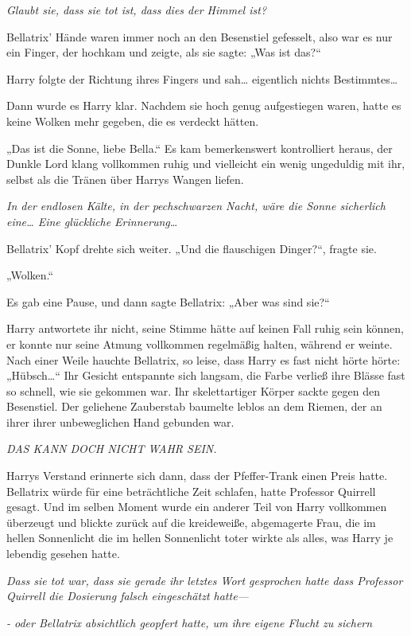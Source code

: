{\emph{Glaubt sie, dass sie tot ist, dass dies der Himmel ist?}

Bellatrix' Hände waren immer noch an den Besenstiel gefesselt, also war es nur ein Finger, der hochkam und zeigte, als sie sagte: „Was ist das?“

Harry folgte der Richtung ihres Fingers und sah… eigentlich nichts Bestimmtes…

Dann wurde es Harry klar. Nachdem sie hoch genug aufgestiegen waren, hatte es keine Wolken mehr gegeben, die es verdeckt hätten.

„Das ist die Sonne, liebe Bella.“ Es kam bemerkenswert kontrolliert heraus, der Dunkle Lord klang vollkommen ruhig und vielleicht ein wenig ungeduldig mit ihr, selbst als die Tränen über Harrys Wangen liefen.

\emph{In der endlosen Kälte, in der pechschwarzen Nacht, wäre die Sonne sicherlich eine… Eine glückliche Erinnerung}…

Bellatrix' Kopf drehte sich weiter. „Und die flauschigen Dinger?“, fragte sie.

„Wolken.“

Es gab eine Pause, und dann sagte Bellatrix: „Aber was sind sie?“

Harry antwortete ihr nicht, seine Stimme hätte auf keinen Fall ruhig sein können, er konnte nur seine Atmung vollkommen regelmäßig halten, während er weinte. Nach einer Weile hauchte Bellatrix, so leise, dass Harry es fast nicht hörte hörte: „Hübsch…“ Ihr Gesicht entspannte sich langsam, die Farbe verließ ihre Blässe fast so schnell, wie sie gekommen war. Ihr skelettartiger Körper sackte gegen den Besenstiel. Der geliehene Zauberstab baumelte leblos an dem Riemen, der an ihrer ihrer unbeweglichen Hand gebunden war.

\emph{DAS KANN DOCH NICHT WAHR SEIN.}

Harrys Verstand erinnerte sich dann, dass der Pfeffer-Trank einen Preis hatte. Bellatrix würde für eine beträchtliche Zeit schlafen, hatte Professor Quirrell gesagt. Und im selben Moment wurde ein anderer Teil von Harry vollkommen überzeugt und blickte zurück auf die kreideweiße, abgemagerte Frau, die im hellen Sonnenlicht die im hellen Sonnenlicht toter wirkte als alles, was Harry je lebendig gesehen hatte.

\emph{Dass sie tot war, dass sie gerade ihr letztes Wort gesprochen hatte dass Professor Quirrell die Dosierung falsch eingeschätzt hatte—}

\emph{- oder Bellatrix absichtlich geopfert hatte, um ihre eigene Flucht zu sichern}

}
